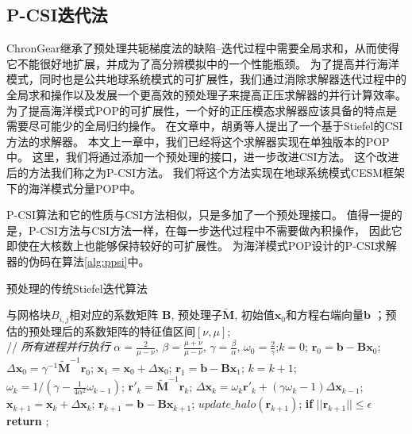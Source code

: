 \subsection{P-CSI迭代法}
\label{precond:pcsi}
ChronGear继承了预处理共轭梯度法的缺陷--迭代过程中需要全局求和，从而使得它不能很好地扩展，并成为了高分辨模拟中的一个性能瓶颈。
为了提高并行海洋模式，同时也是公共地球系统模式的可扩展性，我们通过消除求解器迭代过程中的全局求和操作以及发展一个更高效的预处理子来提高正压求解器的并行计算效率。
为了提高海洋模式POP的可扩展性，一个好的正压模态求解器应该具备的特点是需要尽可能少的全局归约操作。 
在文章\cite{hu2013scalable}中，胡勇等人提出了一个基于Stiefel的CSI方法的求解器。
本文上一章中，我们已经将这个求解器实现在单独版本的POP中。 
这里，我们将通过添加一个预处理的接口，进一步改进CSI方法。
这个改进后的方法我们称之为P-CSI方法。 我们将这个方法实现在地球系统模式CESM框架下的海洋模式分量POP中。 

P-CSI算法和它的性质与CSI方法相似，只是多加了一个预处理接口。 
值得一提的是，P-CSI方法与CSI方法一样，在每一步迭代过程中不需要做內积操作， 因此它即使在大核数上也能够保持较好的可扩展性。
为海洋模式POP设计的P-CSI求解器的伪码在算法\ref{alg:ppsi}中。

\begin{algorithm}[!t]
\caption{ 预处理的传统Stiefel迭代算法}
\label{alg:ppsi}
\begin{algorithmic}[1]
\REQUIRE 与网格块$B_{i,j}$相对应的系数矩阵 $\textbf{B}$, 预处理子$\tilde{\textbf{M}}$, 初始值$\textbf{x}_0$和方程右端向量$\textbf{b}$ ；预估的预处理后的系数矩阵的特征值区间$[\nu,\mu]$;  \\
 // \qquad    \textit{所有进程并行执行}
\STATE $\alpha =\frac{2}{\mu -\nu}$, $ \beta = \frac{\mu +\nu}{\mu -\nu}$, $\gamma = \frac{\beta}{\alpha}$, $\omega_0 =\frac{ 2}{\gamma}$;\quad $k = 0$;
\STATE $\textbf{r}_0 = \textbf{b}-\textbf{B}\textbf{x}_0$; $\Delta \textbf{x}_{0} = \gamma^{-1}\tilde{\textbf{M}}^{-1}\textbf{r}_0$; $\textbf{x}_1 =\textbf{x}_0 +\Delta \textbf{x}_{0}$; $\textbf{r}_1 =\textbf{b} -\textbf{B}\textbf{x}_1$;
\STATE $k=k+1$;
\STATE $\omega_k = 1/(\gamma - \frac{1}{4\alpha^2}\omega_{k-1})$; 
\STATE $\textbf{r}'_{k} =\tilde{\textbf{M}}^{-1}\textbf{r}_{k}$; \label{alg:ppsi_pre}  
\STATE $\Delta \textbf{x}_{k} =\omega_k\textbf{r}'_{k}+(\gamma \omega_k-1)\Delta \textbf{x}_{k-1}$;
\STATE $\textbf{x}_{k+1} =\textbf{x}_{k}+\Delta \textbf{x}_{k}$;
\STATE $\textbf{r}_{k+1} =\textbf{b}- \textbf{B}\textbf{x}_{k+1}$; 
\STATE $update\_halo(\textbf{r}_{k+1})$; 
\STATE \textbf{if} $||\textbf{r}_{k+1}|| \le \epsilon$  \textbf{return} ;
\ENDIF
\ENDWHILE
\end{algorithmic}
\end{algorithm}

